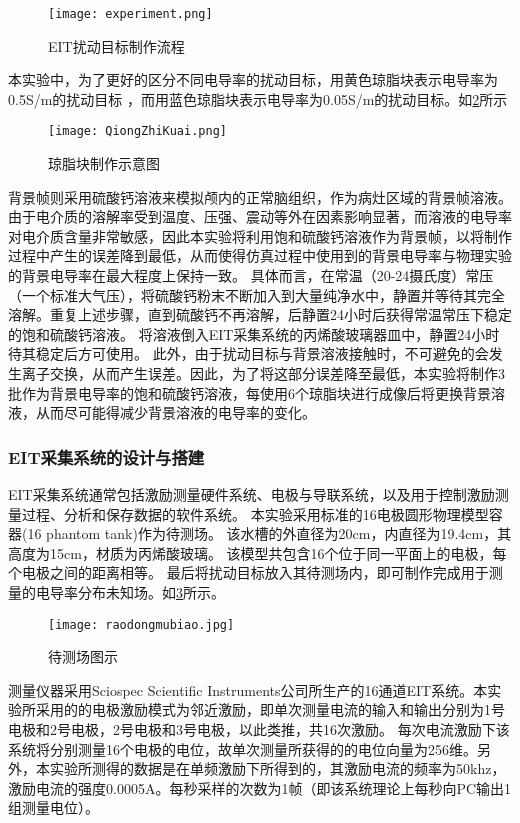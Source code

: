 \begin{figure}[H]
    \centering
    \texttt{[image: experiment.png]}
    \caption{EIT扰动目标制作流程}
    \label{figure:experiment}
\end{figure}

本实验中，为了更好的区分不同电导率的扰动目标，用黄色琼脂块表示电导率为0.5S/m的扰动目标
，而用蓝色琼脂块表示电导率为0.05S/m的扰动目标。如\cref{figure:QiongZhiKuai}所示


\begin{figure}[h]
    \centering

    \texttt{[image: QiongZhiKuai.png]}
    \caption{琼脂块制作示意图}
    \label{figure:QiongZhiKuai}
\end{figure}
背景帧则采用硫酸钙溶液来模拟颅内的正常脑组织，作为病灶区域的背景帧溶液。
由于电介质的溶解率受到温度、压强、震动等外在因素影响显著，而溶液的电导率对电介质含量非常敏感，因此本实验将利用饱和硫酸钙溶液作为背景帧，以将制作过程中产生的误差降到最低，从而使得仿真过程中使用到的背景电导率与物理实验的背景电导率在最大程度上保持一致。
具体而言，在常温（20-24摄氏度）常压（一个标准大气压），将硫酸钙粉末不断加入到大量纯净水中，静置并等待其完全溶解。重复上述步骤，直到硫酸钙不再溶解，后静置24小时后获得常温常压下稳定的饱和硫酸钙溶液。
将溶液倒入EIT采集系统的丙烯酸玻璃器皿中，静置24小时待其稳定后方可使用。
此外，由于扰动目标与背景溶液接触时，不可避免的会发生离子交换，从而产生误差。因此，为了将这部分误差降至最低，本实验将制作3批作为背景电导率的饱和硫酸钙溶液，每使用6个琼脂块进行成像后将更换背景溶液，从而尽可能得减少背景溶液的电导率的变化。

\subsubsection{EIT采集系统的设计与搭建}
EIT采集系统通常包括激励测量硬件系统、电极与导联系统，以及用于控制激励测量过程、分析和保存数据的软件系统。
本实验采用标准的16电极圆形物理模型容器(16 phantom tank)作为待测场。
该水槽的外直径为20cm，内直径为19.4cm，其高度为15cm，材质为丙烯酸玻璃。
该模型共包含16个位于同一平面上的电极，每个电极之间的距离相等。
最后将扰动目标放入其待测场内，即可制作完成用于测量的电导率分布未知场。如\cref{figure:raodongmubiao}所示。
\begin{figure}[H]
    \centering
    \texttt{[image: raodongmubiao.jpg]}
    \caption{待测场图示}
    \label{figure:raodongmubiao}
\end{figure}
测量仪器采用Sciospec Scientific Instruments公司所生产的16通道EIT系统。本实验所采用的的电极激励模式为邻近激励，即单次测量电流的输入和输出分别为1号电极和2号电极，2号电极和3号电极，以此类推，共16次激励。
每次电流激励下该系统将分别测量16个电极的电位，故单次测量所获得的的电位向量为256维。另外，本实验所测得的数据是在单频激励下所得到的，其激励电流的频率为50khz，
激励电流的强度0.0005A。每秒采样的次数为1帧（即该系统理论上每秒向PC输出1组测量电位）。

